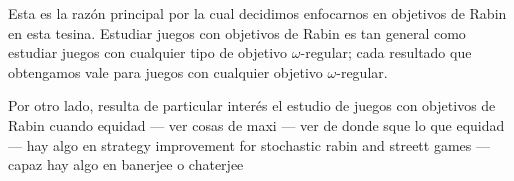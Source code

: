 Esta es la razón principal por la cual decidimos enfocarnos en objetivos de
Rabin en esta tesina. Estudiar juegos con objetivos de Rabin es tan general
como estudiar juegos con cualquier tipo de objetivo $\omega$-regular; cada
resultado que obtengamos vale para juegos con cualquier objetivo
$\omega$-regular.

Por otro lado, resulta de particular interés el estudio de juegos con objetivos
de Rabin cuando equidad --- ver cosas de maxi --- ver de donde sque lo que
equidad --- hay algo en strategy improvement for stochastic rabin and streett
games --- capaz hay algo en banerjee o chaterjee

